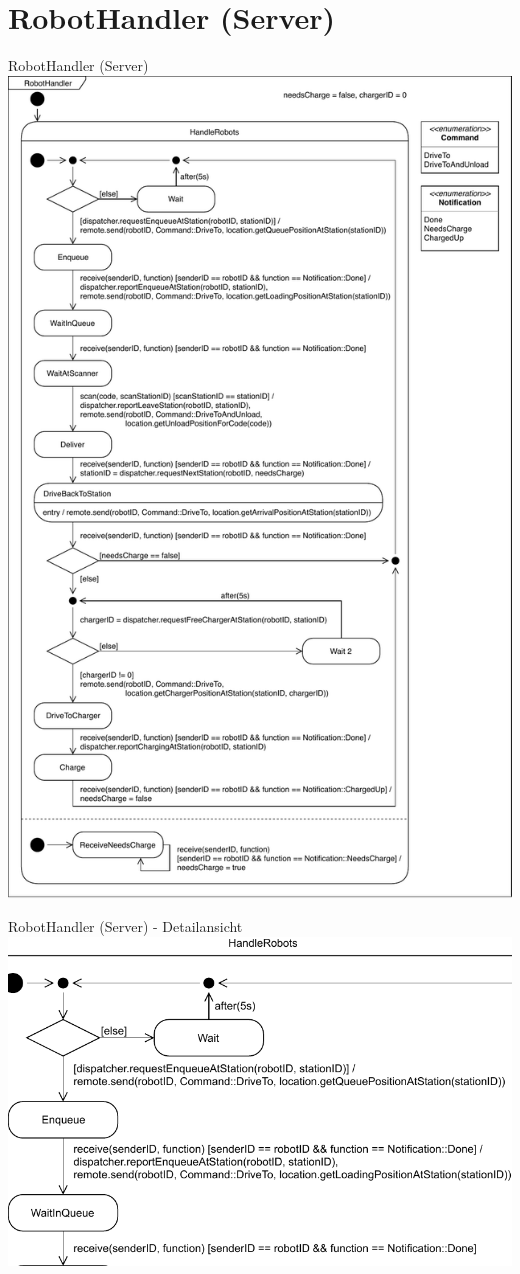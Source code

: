 \documentclass{beamer}
\begin{document}
	\section{RobotHandler (Server)}
	\begin{frame}{RobotHandler (Server)}
	\centering
		\includegraphics[height=0.75\textheight]{PDF/RobotHandler.pdf}
	\end{frame}
	\begin{frame}{RobotHandler (Server) - Detailansicht}
	\includegraphics[height=0.75\textheight]{PDF/RobotHandler1.pdf}
	\end{frame}	
\end{document}
